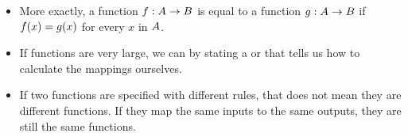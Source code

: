 \documentclass[../../../main.tex]{subfiles}
\begin{document}
\begin{itemize}

  \item More exactly, a function $f : A \rightarrow B$ is equal to a function $g : A \rightarrow B$ if $f(x) = g(x)$ for every $x$ in $A$.
  
  \item If functions are very large, we can  by stating a  or  that tells us how to calculate the mappings ourselves.
  
  \item If two functions are specified with different rules, that does not mean they are different functions. If they map the same inputs to the same outputs, they are still the same functions.

\end{itemize}
\end{document}
